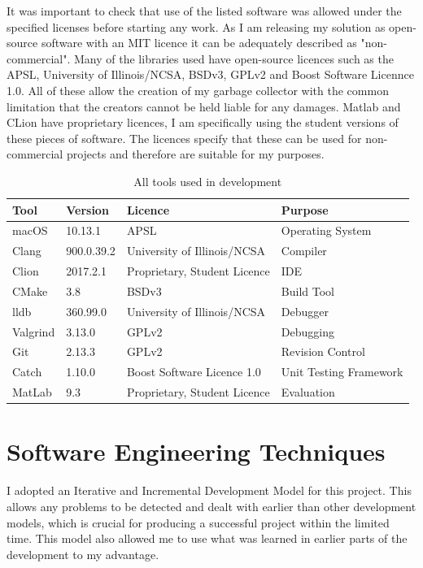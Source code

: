 \documentclass[../diss.tex]{subfiles}
\begin{document}
It was important to check that use of the listed software was allowed under the specified licenses before starting any work. As I am releasing my solution as open-source software with an MIT licence it can be adequately described as "non-commercial". Many of the libraries used have open-source licences such as the APSL, University of Illinois/NCSA, BSDv3, GPLv2 and Boost Software Licennce 1.0. All of these allow the creation of my garbage collector with the common limitation that the creators cannot be held liable for any damages. Matlab and CLion have proprietary licences, I am specifically using the student versions of these pieces of software. The licences specify that these can be used for non-commercial projects and therefore are suitable for my purposes.

\begin{table}
    \centering
    \begin{tabular}{|l|l|l|l|}
        \hline
        \bf{Tool} & \bf{Version} & \bf{Licence} & \bf{Purpose} \\ \hline
        macOS & 10.13.1 & APSL & Operating System \\ \hline
        Clang & 900.0.39.2 & University of Illinois/NCSA & Compiler \\ \hline
        Clion & 2017.2.1 & Proprietary, Student Licence & IDE \\ \hline
        CMake & 3.8 & BSDv3 & Build Tool \\ \hline
        lldb & 360.99.0 & University of Illinois/NCSA & Debugger \\ \hline
        Valgrind & 3.13.0 & GPLv2 & Debugging \\ \hline
        Git & 2.13.3 & GPLv2 & Revision Control \\ \hline
        Catch & 1.10.0 & Boost Software Licence 1.0 & Unit Testing Framework \\ \hline
        MatLab & 9.3 & Proprietary, Student Licence & Evaluation \\ \hline
    \end{tabular}
    \caption{All tools used in development}
    \label{tab:tools}
\end{table}

\section{Software Engineering Techniques} \label{sec:softwareengineering}

I adopted an Iterative and Incremental Development Model for this project. This allows any problems to be detected and dealt with earlier than other development models, which is crucial for producing a successful project within the limited time. This model also allowed me to use what was learned in earlier parts of the development to my advantage.
\end{document}
